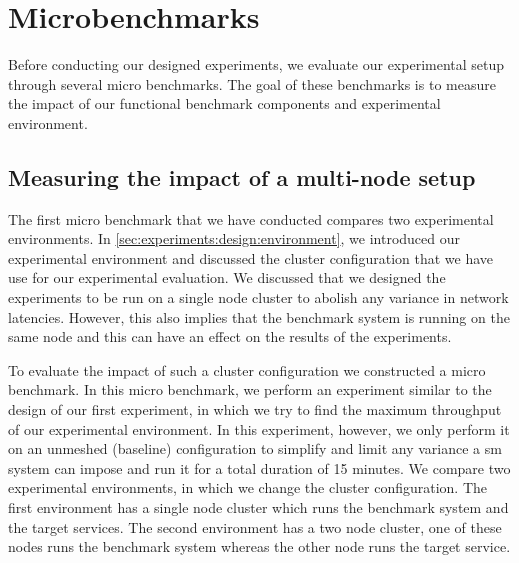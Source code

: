 \section{Microbenchmarks}
\label{sec:experiments:microbenchmarks}

Before conducting our designed experiments, we evaluate our experimental setup through several micro benchmarks. The goal of these benchmarks is to measure the impact of our functional benchmark components and experimental environment.


\subsection{Measuring the impact of a multi-node setup}
\label{sec:experiments:microbenchmarks:node-count}

The first micro benchmark that we have conducted compares two experimental environments. In \cref{sec:experiments:design:environment}, we introduced our experimental environment and discussed the cluster configuration that we have use for our experimental evaluation. We discussed that we designed the experiments to be run on a single node cluster to abolish any variance in network latencies. However, this also implies that the benchmark system is running on the same node and this can have an effect on the results of the experiments.

To evaluate the impact of such a cluster configuration we constructed a micro benchmark. In this micro benchmark, we perform an experiment similar to the design of our first experiment, in which we try to find the maximum throughput of our experimental environment. In this experiment, however, we only perform it on an unmeshed (baseline) configuration to simplify and limit any variance a \gls{sm} system can impose and run it for a total duration of 15 minutes. We compare two experimental environments, in which we change the cluster configuration. The first environment has a single node cluster which runs the benchmark system and the target services. The second environment has a two node cluster, one of these nodes runs the benchmark system whereas the other node runs the target service.


